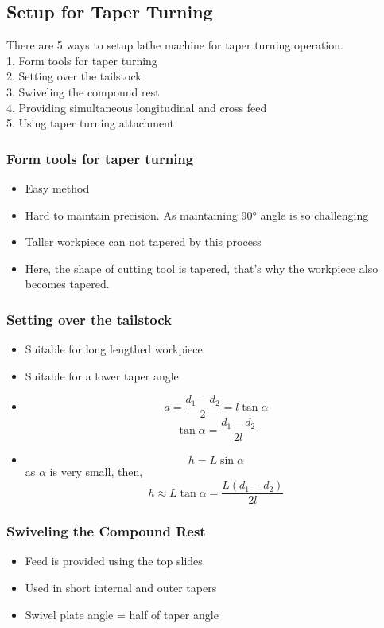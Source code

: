 \documentclass{article}
\begin{document}
\vspace*{1cm}
\subsection*{Setup for Taper Turning}
There are 5 ways to setup lathe machine for taper turning operation.\\
1. Form tools for taper turning\\
2. Setting over the tailstock\\
3. Swiveling the compound rest\\
4. Providing simultaneous longitudinal and cross feed\\
5. Using taper turning attachment\\


\subsubsection*{Form tools for taper turning}
\begin{itemize}
  \item Easy method 
  \item Hard to maintain precision. As maintaining 90° angle is so challenging
  \item Taller workpiece can not tapered by this process 
  \item Here, the shape of cutting tool is tapered, that's why the workpiece also becomes tapered.  
\end{itemize}

\subsubsection*{Setting over the tailstock}
\begin{itemize}
  \item Suitable for long lengthed workpiece 
  \item Suitable for a lower taper angle 
  \item $$a = \frac{d_1-d_2}{2}= l\tan \alpha $$
  $$ \tan \alpha = \frac{d_1-d_2}{2l}$$ 
  \item $$h = L \sin \alpha $$
  as $\alpha$ is very small, then, $$h \approx L \tan \alpha = \frac{L (d_1-d_2)}{2l} $$
\end{itemize}


\subsubsection*{Swiveling the Compound Rest}
\begin{itemize}
  \item Feed is provided using the top slides 
  \item Used in short internal and outer tapers 
  \item Swivel plate angle = half of taper angle 
\end{itemize}
\end{document}
